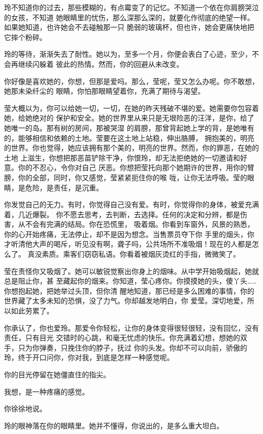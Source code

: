 		玲不知道你的过去，那些模糊的，有点霉变了的记忆。不知道一个依在你肩膀哭泣的女孩，不知道
	她眼睛里的忧伤，那么深那么深的，就要化作彻底的绝望一样。如果她知道，也许她会不去碰触那一只
	脆弱的玻璃杯，但也许，她会更痛快地把它摔个粉碎。

		玲的等待，渐渐失去了耐性。她以为，至多一个月，你便会表白了心迹，至少，不会再继续闪躲着
	彼此的热情。然而，你的回避从未改变。

		你好像是喜欢她的，你想，但那是爱吗。那么，莹呢，莹又怎么办呢。你不敢想，她那未染纤尘的
	眼睛，你怕那眼睛望着你，充满了期待与渴望。

		莹大概以为，你可以给她一切，一切，在她的昨天残破不堪的爱。她需要你包容着她，给她绝对的
	保护和安全。她的世界里从来只是无垠险恶的汪洋，是你，给了她唯一的岛。那有树的房间，那被哭湿
	的肩膀，那曾背起她上学的背，是她唯有的，能够相信和依赖的土地。莹要在这土地上站稳，伸出胳膊，
	拥抱美的，明亮的世界。你也觉得，她应该拥有那个美的，明亮的世界。然而，你的罪恶，在她的土地
	上滋生，你想把那恶苗铲除干净，你恨玲，却无法拒绝她的一切邀请和好意。你的不忍心，令你对自己
	厌恶。你想把莹托向那个她期许的世界，用你的臂膀，你的全部，同时，你又感觉，莹紧紧扼住你的喉
	咙，让你无法呼吸。莹的眼睛，是危险，是责任，是沉重。


		你发觉自己的无力。有时，你觉得自己没有爱。有时，你觉得你的身体，被爱充满着，几近爆裂。
	你不愿去思考，去判断，去选择。任何的决定和分辨，都是伤害，从不会有完满的结局。你在恐慌里，
	吸着烟。你看到车窗外，风景的熟悉，你的心开始疼痛，无法停止，却不是因为想念。当售票员夺下你
	手里的烟头，你才听清他大声的喝斥，听见没有啊，聋子吗，公共场所不准吸烟！现在的人都是怎么了。
	真没素质。乘客们窃窃私语。你看着被烟灰烫红的手指，微微笑了。

		莹在责怪你又吸烟了。她可以敏锐觉察出你身上的烟味。从中学开始吸烟起，她就总是阻止你，甚
	至藏起你的烟来。你知道，莹心疼你。你摸摸她的头，傻丫头…… 你想抱起她，把她举过头顶，但你清
	醒地知道，那已经是多么困难的事情，你的世界藏了太多未知的恐惧，没了力气。你却越发地明白，你
	爱莹。深切地爱，所以如此劳累了。


		你承认了，你也爱玲。那爱令你轻松，让你的身体变得很轻很轻，没有回忆，没有责任，只有目光
	交错时的心跳，和毫无忧虑的快乐。你充满着幻想，想她的双手，只为你弹奏，只挽住你的脖子，抚过
	你的头发。你却不可以向前，骄傲的玲，终于开口问你，你对我，到底是怎样一种感觉呢。

		你的目光停留在她僵直住的指尖。

		我想，是一种疼痛的感觉。

		你徐徐地说。

		玲的眼神落在你的眼睛里。她并不懂得，你说出的，是多么重大坦白。

